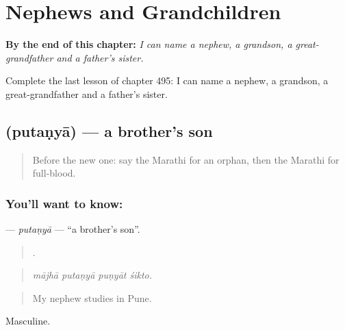 
\chapter{Nephews and Grandchildren}
\label{ch:mr-nephews-and-grandchildren}

\begin{chapteropening}
\textbf{By the end of this chapter:} \emph{I can name a nephew, a grandson, a great-grandfather and a father's sister.}

Complete the last lesson of chapter 495: I can name a nephew, a grandson, a great-grandfather and a father's sister.
\end{chapteropening}

\section[\texorpdfstring{\mr{पुतण्या} (putaṇyā)}{पुतण्या (putaṇyā)}]{ (putaṇyā) — a brother's son}

\label{lesson:MR-C495-putanya}



\begin{quote}
Before the new one: say the Marathi for an orphan, then the Marathi for full-blood.
\end{quote}

\subsection*{You'll want to know: }
\textbf{} — \emph{putaṇyā} — \textquotedblleft{}a brother's son\textquotedblright{}.

\begin{quote}
   .
\end{quote}

\begin{quote}
\emph{mājhā putaṇyā puṇyāt śikto.}
\end{quote}

\begin{quote}
My nephew studies in Pune.
\end{quote}

Masculine.

